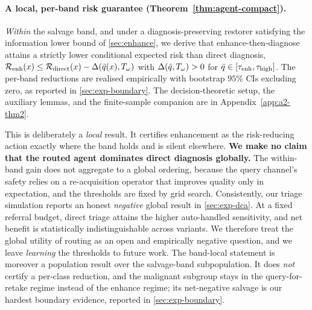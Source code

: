 \paragraph{A local, per-band risk guarantee (Theorem~\ref{thm:agent-compact}).}\label{sec:agent-thm2}
\emph{Within} the salvage band, and under a diagnosis-preserving restorer satisfying the information
lower bound of \cref{sec:enhance}, we derive that enhance-then-diagnose attains a strictly lower
conditional expected risk than direct diagnosis,
$\mathcal{R}_{\mathrm{enh}}(x)\le\mathcal{R}_{\mathrm{direct}}(x)-\Delta(\bar{q}(x),T_\omega)$ with $\Delta(\bar{q},T_\omega)>0$ for
$\bar{q}\in[\tau_{\mathrm{enh}},\tau_{\mathrm{high}}]$. The per-band reductions are realised empirically with bootstrap $95\%$
CIs excluding zero, as reported in \cref{sec:exp-boundary}. The decision-theoretic setup, the auxiliary
lemmas, and the finite-sample companion are in Appendix~\ref{app:a2-thm2}.



This is deliberately a \emph{local} result. It certifies enhancement as the risk-reducing action
exactly where the band holds and is silent elsewhere. \textbf{We make no claim that the routed agent
dominates direct diagnosis globally.} The within-band gain does not aggregate to a global ordering,
because the query channel's safety relies on a re-acquisition operator that improves quality only in
expectation, and the thresholds are fixed by grid search. Consistently, our triage simulation reports
an honest \emph{negative} global result in \cref{sec:exp-dca}. At a fixed referral budget, direct
triage attains the higher auto-handled sensitivity, and net benefit is statistically indistinguishable
across variants. We therefore treat the global utility of routing as an open and empirically negative
question, and we leave \emph{learning} the thresholds to future work. The band-local statement is
moreover a population result over the salvage-band subpopulation. It does \emph{not} certify a
per-class reduction, and the malignant subgroup stays in the query-for-retake regime instead of the
enhance regime; its net-negative salvage is our hardest boundary evidence, reported in
\cref{sec:exp-boundary}.
